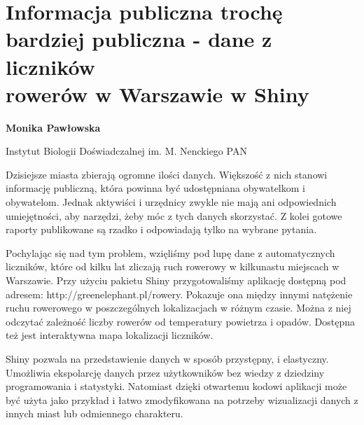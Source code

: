 \documentclass[\main/boa.tex]{subfiles}
\begin{document}
\section[Informacja publiczna trochę bardziej publiczna - dane z liczników rowerów \\ w Warszawie w Shiny]{Informacja publiczna trochę bardziej publiczna - dane z liczników \\ rowerów w Warszawie w Shiny}

\begin{minipage}{0.915\textwidth}
	\centering
  {\bf {}  Monika Pawłowska}
\end{minipage}


\begin{affiliations}
\begin{minipage}{0.915\textwidth}
\centering
Instytut Biologii Doświadczalnej im. M. Nenckiego PAN   \\[-2pt]
\end{minipage}
\end{affiliations}

\vskip 0.3cm

 Dzisiejsze miasta zbierają ogromne ilości danych. Większość z nich stanowi informację publiczną, która powinna być udostępniana obywatelkom i obywatelom. Jednak aktywiści i urzędnicy zwykle nie mają ani odpowiednich umiejętności, aby narzędzi, żeby móc z tych danych skorzystać. Z kolei gotowe raporty publikowane są rzadko i odpowiadają tylko na wybrane pytania.
 
 Pochylając się nad tym problem, wzięliśmy pod lupę dane z automatycznych liczników, które od kilku lat zliczają ruch rowerowy w kilkunastu miejscach w Warszawie. Przy użyciu pakietu Shiny przygotowaliśmy aplikację dostępną pod adresem: \break http://greenelephant.pl/rowery. Pokazuje ona między innymi natężenie ruchu rowerowego w poszczególnych lokalizacjach w różnym czasie. Można z niej odczytać zależność liczby rowerów od temperatury powietrza i opadów. Dostępna też jest interaktywna mapa lokalizacji liczników.
 
 Shiny pozwala na przedstawienie danych w sposób przystępny, i elastyczny. Umożliwia ekspolarcję danych przez użytkowników bez wiedzy z dziedziny programowania i statystyki. Natomiast dzięki otwartemu kodowi aplikacji może być użyta jako przykład i łatwo zmodyfikowana na potrzeby wizualizacji danych z innych miast lub odmiennego charakteru.
\end{document}
